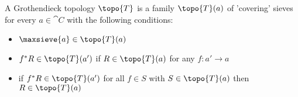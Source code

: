 \begin{definition}
A Grothendieck topology $\topo{T}$ is a family $\topo{T}(a)$ 
of 'covering' sieves for every $a\in \cat{C}$ with the following conditions:
\begin{itemize}
\item  $\maxsieve{a} \in \topo{T}(a)$
\item $f^*R\in \topo{T}(a')$ if $R\in \topo{T}(a)$ 
for any $f:a'\rightarrow a$
\item if $f^*R\in \topo{T}(a')$ for all $f\in S$ 
with $S\in \topo{T}(a)$ then $R\in \topo{T}(a)$
\end{itemize}
\end{definition}